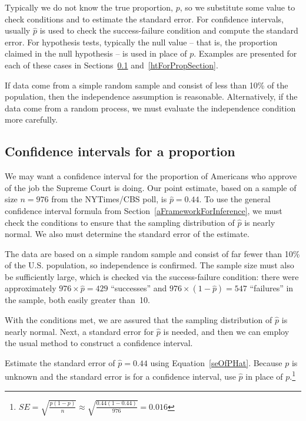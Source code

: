 Typically we do not know the true proportion, $p$, so we substitute some value to check conditions and to estimate the standard error. For confidence intervals, usually $\hat{p}$ is used to check the success-failure condition and compute the standard error. For hypothesis tests, typically the null value -- that is, the proportion claimed in the null hypothesis -- is used in place of $p$. Examples are presented for each of these cases in Sections~\ref{confIntForPropSection} and~\ref{htForPropSection}.

\begin{tipBox}{
If data come from a simple random sample and consist of less than 10\% of the population, then the independence assumption is reasonable. Alternatively, if the data come from a random process, we must evaluate the independence condition more carefully.}
\end{tipBox}


\subsection{Confidence intervals for a proportion}
\label{confIntForPropSection}


We may want a confidence interval for the proportion of Americans who approve of the job the Supreme Court is doing. Our point estimate, based on a sample of size $n = 976$ from the NYTimes/CBS poll, is $\hat{p} = 0.44$. To use the general confidence interval formula from Section~\ref{aFrameworkForInference}, we must check the conditions to ensure that the sampling distribution of $\hat{p}$ is nearly normal. We also must determine the standard error of the estimate.

The data are based on a simple random sample and consist of far fewer than 10\% of the U.S. population, so independence is confirmed. The sample size must also be sufficiently large, which is checked via the success-failure condition: there were approximately $976\times \hat{p}=429$ ``successes'' and $976\times (1-\hat{p})=547$ ``failures'' in the sample, both easily greater than~10.

With the conditions met, we are assured that the sampling distribution of $\hat{p}$ is nearly normal. Next, a standard error for $\hat{p}$ is needed, and then we can employ the usual method to construct a confidence interval.

\begin{exercise} \label{seOfPropOfAmericansJobApprovalOfSupremeCourt}
Estimate the standard error of $\hat{p}=0.44$ using Equation~\eqref{seOfPHat}. Because $p$ is unknown and the standard error is for a confidence interval, use $\hat{p}$ in place of $p$.\footnote{$SE = \sqrt{\frac{p(1-p)}{n}} \approx \sqrt{\frac{0.44(1-0.44)}{976}} = 0.016$}
\end{exercise}


